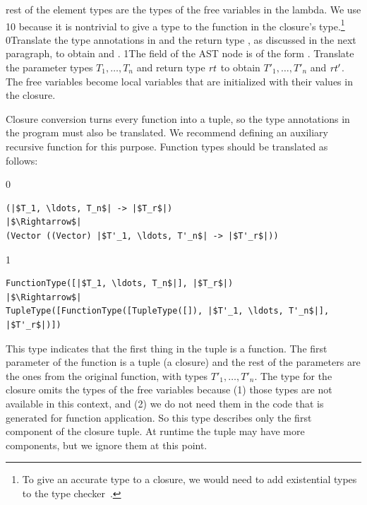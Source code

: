 \documentclass[7x10]{TimesAPriori_MIT}%
\def\racketEd{0}
\def\pythonEd{1}
\def\edition{1}
\newcommand{\racket}[1]{{\if\edition\racketEd{#1}\fi}}
\newcommand{\pythonColor}[0]{}
\newcommand{\python}[1]{{\if\edition\pythonEd\pythonColor #1\fi}}
\numberwithin{theorem}{chapter}
\numberwithin{definition}{chapter}
\numberwithin{equation}{chapter}
\begin{document}
rest of the element types are the types of the free variables in the
lambda. We use \python{}\racket{\code{\_}} because it
is nontrivial to give a type to the function in the closure's
type.\footnote{To give an accurate type to a closure, we would need to
  add existential types to the type checker~\citep{Minamide:1996ys}.}
%
\racket{Translate the type
  annotations in  and the return type \itm{rt}, as discussed in
  the next paragraph, to obtain \itm{ps'} and \itm{rt'}.}%
\python{The  field of the  AST node
  is of the form \code{FunctionType([$x_1:T_1,\ldots, x_n:T_n$], $rt$)}.
  Translate the parameter types $T_1,\ldots,T_n$ and return type $\mathit{rt}$
  to obtain $T'_1,\ldots, T'_n$ and $\mathit{rt'}$.}
The free variables become local variables that are initialized with
their values in the closure.

Closure conversion turns every function into a tuple, so the type
annotations in the program must also be translated.  We recommend
defining an auxiliary recursive function for this purpose.  Function
types should be translated as follows:
%
{\if\edition\racketEd
\begin{lstlisting}
(|$T_1, \ldots, T_n$| -> |$T_r$|)
|$\Rightarrow$|  
(Vector ((Vector) |$T'_1, \ldots, T'_n$| -> |$T'_r$|))
\end{lstlisting}
\fi}
{\if\edition\pythonEd\pythonColor
\begin{lstlisting}
FunctionType([|$T_1, \ldots, T_n$|], |$T_r$|)
|$\Rightarrow$|  
TupleType([FunctionType([TupleType([]), |$T'_1, \ldots, T'_n$|], |$T'_r$|)])
\end{lstlisting}
\fi}
%
This type indicates that the first thing in the tuple is a
function. The first parameter of the function is a tuple (a closure)
and the rest of the parameters are the ones from the original
function, with types $T'_1, \ldots, T'_n$.  The type for the closure
omits the types of the free variables because (1) those types are not
available in this context, and (2) we do not need them in the code that
is generated for function application. So this type describes only the
first component of the closure tuple. At runtime the tuple may have
more components, but we ignore them at this point.
\end{document}
